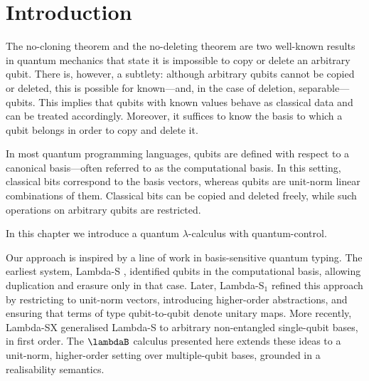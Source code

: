 \section{Introduction}

The no-cloning theorem \cite{WoottersZurek1982} and the no-deleting theorem
\cite{PatiBraunstein2000} are two well-known results in quantum mechanics that
state it is impossible to copy or delete an arbitrary qubit. 
There is, however, a subtlety: although arbitrary qubits
cannot be copied or deleted, this is possible for known---and, in the case of
deletion, separable---qubits. This implies that qubits with known values behave
as classical data and can be treated accordingly. Moreover, it suffices to know
the basis to which a qubit belongs in order to copy and delete it.

In most quantum programming languages, qubits are defined with respect to a
canonical basis—often referred to as the computational basis. In this setting,
classical bits correspond to the basis vectors, whereas qubits are unit-norm
linear combinations of them. Classical bits can be copied and deleted freely,
while such operations on arbitrary qubits are restricted.

In this chapter we introduce a quantum $\lambda$-calculus with quantum-control. 

Our approach is inspired by a line of work in basis-sensitive quantum typing. The earliest system,
Lambda-S \cite{DiazcaroDowekRinaldiBIO19}, identified qubits
in the computational basis, allowing duplication and erasure only in that
case. Later, Lambda-S$_1$
\cite{DiazcaroGuillermoMiquelValironLICS19,DiazCaroMalherbe2022} refined this
approach by restricting to unit-norm vectors, introducing higher-order
abstractions, and ensuring that terms of type qubit-to-qubit denote unitary
maps. More recently, Lambda-SX \cite{DiazcaroMonzonAPLAS25}
generalised Lambda-S to arbitrary non-entangled single-qubit bases, in first order. 
The $\lambdaB$ calculus presented here extends these ideas to a unit-norm, higher-order setting over
multiple-qubit bases, grounded in a realisability semantics.

